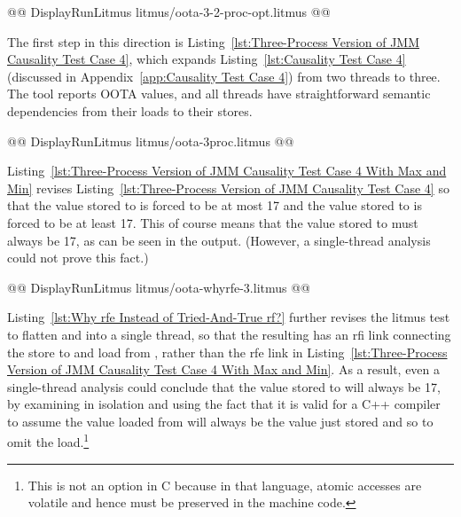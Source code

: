 \documentclass[10]{article}
\begin{document}
\begin{listing}[tbp]
@@ DisplayRunLitmus litmus/oota-3-2-proc-opt.litmus @@
\caption{OOTA With an Intrathread Store-Load Link, Optimized}
\label{lst:OOTA With an Intrathread Store-Load Link, Optimized}
\end{listing}

The first step in this direction is
Listing~\ref{lst:Three-Process Version of JMM Causality Test Case 4},
which expands
Listing~\ref{lst:Causality Test Case 4}
(discussed in
Appendix~\ref{app:Causality Test Case 4})
from two threads to three.
The  tool reports OOTA values, and
all threads have straightforward semantic dependencies from their
loads to their stores.

\begin{listing}[tbp]
@@ DisplayRunLitmus litmus/oota-3proc.litmus @@
\caption{Three-Process Version of JMM Causality Test Case 4}
\label{lst:Three-Process Version of JMM Causality Test Case 4}
\end{listing}

Listing~\ref{lst:Three-Process Version of JMM Causality Test Case 4 With Max and Min}
revises Listing~\ref{lst:Three-Process Version of JMM Causality Test Case 4}
so that the value stored to  is forced to be at most 17
and the value stored to  is forced to be at least 17.
This of course means that the value stored to  must always be
17, as can be seen in the  output.
(However, a single-thread analysis could not prove this fact.)

\begin{listing}[tbp]
@@ DisplayRunLitmus litmus/oota-whyrfe-3.litmus @@
\caption{Three-Process Version of JMM Causality Test Case 4 With Max and Min}
\label{lst:Three-Process Version of JMM Causality Test Case 4 With Max and Min}
\end{listing}

Listing~\ref{lst:Why rfe Instead of Tried-And-True rf?}
further revises the litmus test
to flatten  and  into a single thread, so that the
resulting  has an rfi link connecting
the store to and load from , rather than the rfe link in
Listing~\ref{lst:Three-Process Version of JMM Causality Test Case 4 With Max and Min}.
As a result, even a single-thread analysis could conclude that the value
stored to  will always be 17, by examining  in isolation and
using the fact that it is valid for a C++ compiler to assume the value
loaded from  will always be the value just stored and so to omit
the load.\footnote{
	This is not an option in C because in that language,
	atomic accesses are volatile and hence must be preserved
	in the machine code.}
\end{document}
